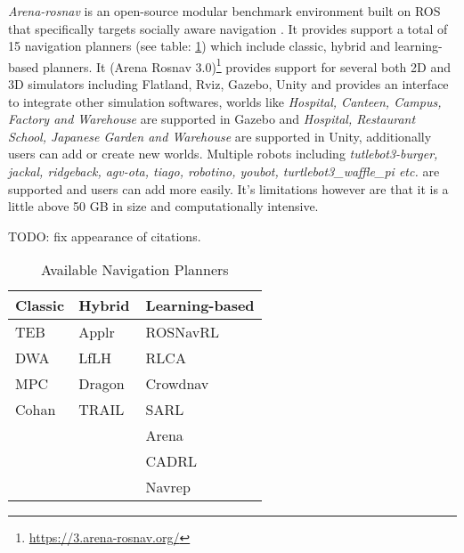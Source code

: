 \textit{Arena-rosnav} is an open-source  modular benchmark environment built on ROS that specifically targets
socially aware navigation \cite{arenarosnav}. It provides support a total of 15 navigation planners (see table: \ref{tab:navigation_planners})
which include classic, hybrid and learning-based planners. It (Arena Rosnav 3.0)\footnote{\href{https://3.arena-rosnav.org/}{https://3.arena-rosnav.org/}} provides 
support for several both 2D and 3D simulators including Flatland, Rviz, Gazebo, Unity and provides 
an interface to integrate other simulation softwares, worlds like  
\textit{Hospital, Canteen, Campus, Factory and Warehouse} are supported in Gazebo and 
\textit{Hospital, Restaurant School, Japanese Garden and Warehouse} are supported in Unity,
additionally users can add or create new worlds. Multiple robots including 
\textit{tutlebot3-burger, jackal, ridgeback, agv-ota, tiago, robotino, youbot, turtlebot3\_waffle\_pi etc.} 
are supported and users can add more easily. It's limitations however are that it is a little above 
50 GB in size and computationally intensive. 

\noindent TODO: fix appearance of citations.
\begin{table}[ht]
    \centering
    \caption{Available Navigation Planners}
    \label{tab:navigation_planners}
    \begin{tabularx}{\textwidth}{X X X}
        \hline
        \textbf{Classic}    & \textbf{Hybrid}                       & \textbf{Learning-based} \\
        \hline
        TEB~\cite{teb}      & Applr~\cite{applr}                    & ROSNavRL~\cite{arenarosnav} \\
        DWA~\cite{dwa}      & LfLH~\cite{lflh}                      & RLCA~\cite{rlca} \\
        MPC~\cite{mpc}      & Dragon~\cite{dragontrail}             & Crowdnav~\cite{crowdnav} \\
        Cohan~\cite{cohan}  & TRAIL~\cite{dragontrail}              & SARL~\cite{sarl} \\
                            &                                       & Arena~\cite{arena} \\
                            &                                       & CADRL~\cite{cadrl} \\
                            &                                       & Navrep~\cite{navrep} \\
        \hline
    \end{tabularx}
\end{table}
   
